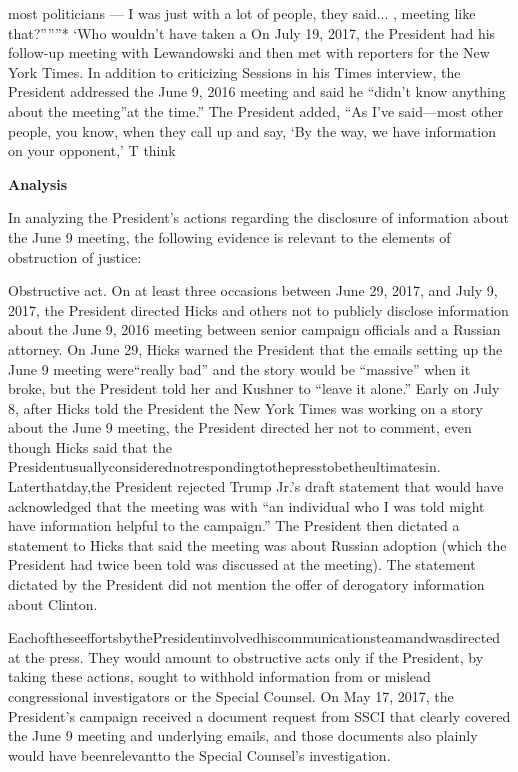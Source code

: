 most politicians — I was just with a lot of people, they said... , meeting like that?”””*
‘Who wouldn't have taken a
On July 19, 2017, the President had his follow-up meeting with Lewandowski and then met with reporters for the New York Times. In addition to criticizing Sessions in his Times interview, the President addressed the June 9, 2016 meeting and said he “didn't know anything about the meeting”at the time.” The President added, “As I've said—most other people, you know, when they call up and say, ‘By the way, we have information on your opponent,' T think

\begin{center}
\textbf{Analysis}
\end{center}

In analyzing the President's actions regarding the disclosure of information about the June 9 meeting, the following evidence is relevant to the elements of obstruction of justice:

Obstructive act. On at least three occasions between June 29, 2017, and July 9, 2017, the President directed Hicks and others not to publicly disclose information about the June 9, 2016 meeting between senior campaign officials and a Russian attorney. On June 29, Hicks warned the President that the emails setting up the June 9 meeting were“really bad” and the story would be “massive” when it broke, but the President told her and Kushner to “leave it alone.” Early on July 8, after Hicks told the President the New York Times was working on a story about the June 9 meeting, the President directed her not to comment, even though Hicks said that the Presidentusuallyconsiderednotrespondingtothepresstobetheultimatesin. Laterthatday,the President rejected Trump Jr.'s draft statement that would have acknowledged that the meeting was with “an individual who I was told might have information helpful to the campaign.” The President then dictated a statement to Hicks that said the meeting was about Russian adoption (which the President had twice been told was discussed at the meeting). The statement dictated by the President did not mention the offer of derogatory information about Clinton.

EachoftheseeffortsbythePresidentinvolvedhiscommunicationsteamandwasdirected at the press. They would amount to obstructive acts only if the President, by taking these actions, sought to withhold information from or mislead congressional investigators or the Special Counsel. On May 17, 2017, the President's campaign received a document request from SSCI that clearly covered the June 9 meeting and underlying emails, and those documents also plainly would have beenrelevantto the Special Counsel's investigation.

